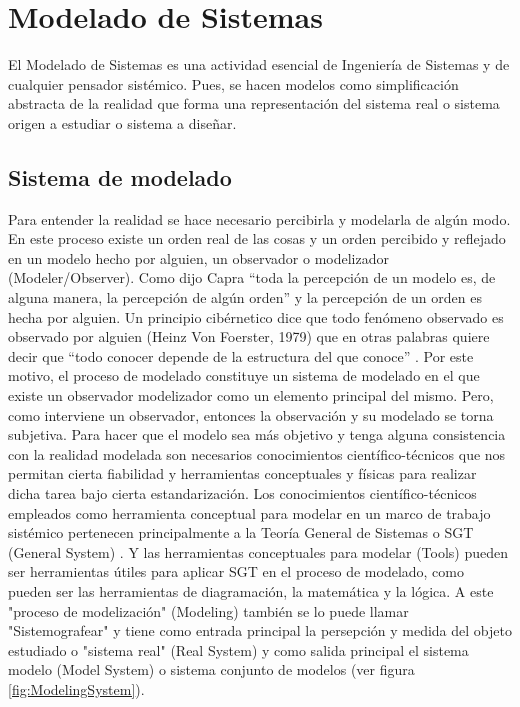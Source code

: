 
\chapter{Modelado de Sistemas}

El Modelado de Sistemas es una actividad esencial de Ingeniería de Sistemas y de cualquier pensador sistémico. Pues, se hacen modelos como simplificación abstracta de la realidad \cite{Meadows-2009} que forma una representación del sistema real \cite{Fiuba-2005} o sistema origen a estudiar o sistema a diseñar.

\section{Sistema de modelado}

Para entender la realidad se hace necesario percibirla y modelarla de algún modo. En este proceso existe un orden real de las cosas y un orden percibido y reflejado en un modelo hecho por alguien, un observador o modelizador (Modeler/Observer). Como dijo Capra “toda la percepción de un modelo es, de alguna manera, la percepción de algún orden” \cite{Fritjof-Capra-1975} y la percepción de un orden es hecha por alguien. Un principio cibérnetico dice que todo fenómeno observado es observado por alguien (Heinz Von Foerster, 1979) que en otras palabras quiere decir que “todo conocer depende de la estructura del que conoce” \cite{Maturana-1984}. Por este motivo, el proceso de modelado constituye un sistema de modelado en el que existe un observador modelizador como un elemento principal del mismo. Pero, como interviene un observador, entonces la observación y su modelado se torna subjetiva. Para hacer que el modelo sea más objetivo y tenga alguna consistencia con la realidad modelada son necesarios conocimientos científico-técnicos que nos permitan cierta fiabilidad y herramientas conceptuales y físicas para realizar dicha tarea bajo cierta estandarización. Los conocimientos científico-técnicos empleados como herramienta conceptual para modelar en un marco de trabajo sistémico pertenecen principalmente a la Teoría General de Sistemas o SGT (General System) \cite{Sarabia-1995}. Y las herramientas conceptuales para modelar (Tools) pueden ser herramientas útiles para aplicar SGT en el proceso de modelado, como pueden ser las herramientas de diagramación, la matemática y la lógica. A este "proceso de modelización" (Modeling) también se lo puede llamar "Sistemografear" \cite{Le-Moigne-1994} y tiene como entrada principal la persepción y medida del objeto estudiado o "sistema real" (Real System) y como salida principal el sistema modelo (Model System) o sistema conjunto de modelos (ver figura \ref{fig:ModelingSystem}).

